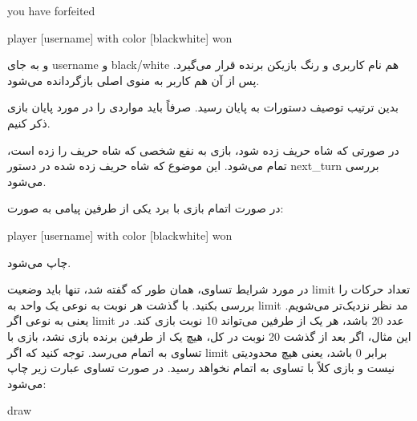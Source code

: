 \documentclass[]{article}
\begin{document}
\begin{tcolorbox}[boxrule=0pt]
	\begin{latin}
  	  \large{
  	  	you have forfeited
		}
	\end{latin}
\end{tcolorbox}




\begin{tcolorbox}[boxrule=0pt]
	\begin{latin}
  	  \large{
  	  	player [username] with color [black\/white] won
		}
	\end{latin}
\end{tcolorbox}


و به جای username و black/white هم نام کاربری و رنگ بازیکن برنده قرار می‌گیرد. پس از آن هم کاربر به منوی اصلی بازگردانده می‌شود.

بدین ترتیب توصیف دستورات به پایان رسید. صرفاً باید مواردی را در مورد پایان بازی ذکر کنیم.

\hrulefill

در صورتی که شاه حریف زده شود، بازی به نفع شخصی که شاه حریف را زده است، تمام می‌شود. این موضوع که شاه حریف زده شده در دستور next\_turn بررسی می‌شود.

در صورت اتمام بازی با برد یکی از طرفین پیامی به صورت:



\begin{tcolorbox}[boxrule=0pt]
	\begin{latin}
  	  \large{
  	  	player [username] with color [black\/white] won
		}
	\end{latin}
\end{tcolorbox}

چاپ می‌شود.

در مورد شرایط تساوی، همان طور که گفته شد، تنها باید وضعیت limit تعداد حرکات را بررسی بکنید. با گذشت هر نوبت به نوعی یک واحد به limit مد نظر نزدیک‌تر می‌شویم. یعنی به نوعی اگر limit عدد 20 باشد، هر یک از طرفین می‌تواند 10 نوبت بازی کند. در این مثال، اگر بعد از گذشت 20 نوبت در کل، هیچ یک از طرفین برنده بازی نشد، بازی با تساوی به اتمام می‌رسد. توجه کنید که اگر limit برابر 0 باشد، یعنی هیچ محدودیتی نیست و بازی کلاً با تساوی به اتمام نخواهد رسید. در صورت تساوی عبارت زیر چاپ می‌شود:



\begin{tcolorbox}[boxrule=0pt]
	\begin{latin}
  	  \large{
  	  	draw
		}
	\end{latin}
\end{tcolorbox}
\end{document}
